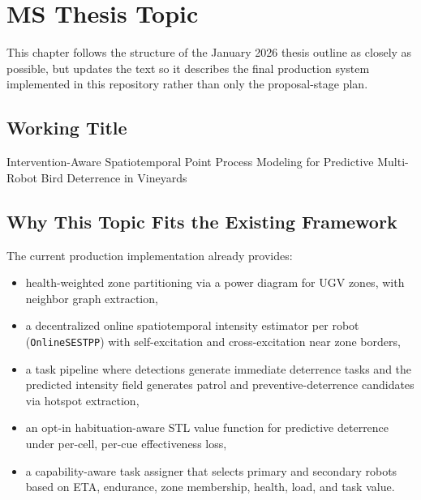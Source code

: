 
\chapter{MS Thesis Topic}

This chapter follows the structure of the January 2026 thesis outline as closely as possible, but updates the text so it describes the final production system implemented in this repository rather than only the proposal-stage plan.

\section{Working Title}

Intervention-Aware Spatiotemporal Point Process Modeling for Predictive Multi-Robot Bird Deterrence in Vineyards

\section{Why This Topic Fits the Existing Framework}

The current production implementation already provides:

\begin{itemize}
\item health-weighted zone partitioning via a power diagram for UGV zones, with neighbor graph extraction,
\item a decentralized online spatiotemporal intensity estimator per robot (\texttt{OnlineSESTPP}) with self-excitation and cross-excitation near zone borders,
\item a task pipeline where detections generate immediate deterrence tasks and the predicted intensity field generates patrol and preventive-deterrence candidates via hotspot extraction,
\item an opt-in habituation-aware STL value function for predictive deterrence under per-cell, per-cue effectiveness loss,
\item a capability-aware task assigner that selects primary and secondary robots based on ETA, endurance, zone membership, health, load, and task value.
\end{itemize}

